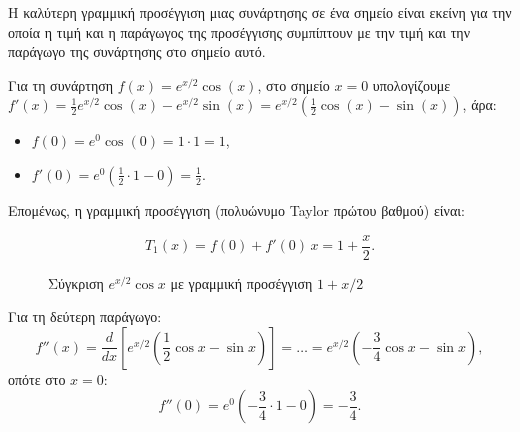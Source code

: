 \documentclass[a4paper, 11pt]{article}
\providecommand{\tightlist}{\setlength{\itemsep}{0pt}\setlength{\parskip}{0pt}}
\begin{document}
Η καλύτερη γραμμική προσέγγιση μιας συνάρτησης σε ένα σημείο είναι
εκείνη για την οποία η τιμή και η παράγωγος της προσέγγισης συμπίπτουν
με την τιμή και την παράγωγο της συνάρτησης στο σημείο αυτό.

Για τη συνάρτηση \(f(x) = e^{x/2} \cos(x)\), στο σημείο \(x = 0\)
υπολογίζουμε
\(f'(x) = \frac{1}{2} e^{x/2} \cos(x) - e^{x/2} \sin(x) = e^{x/2} \left( \frac{1}{2} \cos(x) - \sin(x) \right)\),
άρα:

\begin{itemize}
\tightlist
\item
  \(f(0) = e^{0} \cos(0) = 1 \cdot 1 = 1\),\\
\item
  \(f'(0) = e^{0} \left( \frac{1}{2} \cdot 1 - 0 \right) = \frac{1}{2}\).
\end{itemize}

Επομένως, η γραμμική προσέγγιση (πολυώνυμο Taylor πρώτου βαθμού) είναι:

\[
\boxed{T_1(x) = f(0) + f'(0) \, x = 1 + \frac{x}{2}}.
\]

\begin{figure}[htbp]
\centering
{}
\caption{Σύγκριση $e^{x/2}\cos x$ με γραμμική προσέγγιση $1+x/2$}
\label{fig:expcoslinear}
\end{figure}

Για τη δεύτερη παράγωγο: \[
f''(x) = \frac{d}{dx} \left[ e^{x/2} \left( \frac{1}{2}\cos x - \sin x \right) \right] 
= \dots 
= e^{x/2} \left( -\frac{3}{4}\cos x - \sin x \right),
\] οπότε στο \(x=0\): \[
f''(0) = e^{0} \left( -\frac{3}{4} \cdot 1 - 0 \right) = -\frac{3}{4}.
\]
\end{document}
